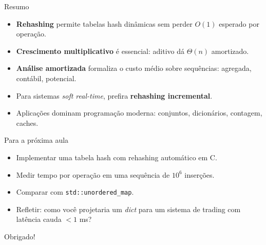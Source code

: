 \documentclass[aspectratio=169]{beamer}
\begin{document}
\begin{frame}{Resumo}
\begin{itemize}
    \item \textbf{Rehashing} permite tabelas hash dinâmicas sem perder $O(1)$
    esperado por operação.
    \item \textbf{Crescimento multiplicativo} é essencial: aditivo dá $\Theta(n)$
    amortizado.
    \item \textbf{Análise amortizada} formaliza o custo médio sobre sequências:
    agregada, contábil, potencial.
    \item Para sistemas \emph{soft real-time}, prefira \textbf{rehashing incremental}.
    \item Aplicações dominam programação moderna: conjuntos, dicionários, contagem,
    caches.
\end{itemize}
\end{frame}

\begin{frame}{Para a próxima aula}
\begin{itemize}
    \item Implementar uma tabela hash com rehashing automático em C.
    \item Medir tempo por operação em uma sequência de $10^6$ inserções.
    \item Comparar com \texttt{std::unordered\_map}.
    \item Refletir: como você projetaria um \emph{dict} para um sistema de
    trading com latência cauda $< 1$ ms?
\end{itemize}
\centering\Large Obrigado!
\end{frame}
\end{document}
